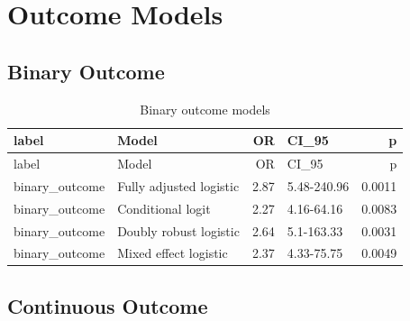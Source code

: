 \documentclass[
]{article}
\newenvironment{Shaded}{\begin{snugshade}}{\end{snugshade}}
\newcommand{\AttributeTok}[1]{\textcolor[rgb]{0.13,0.29,0.53}{#1}}
\newcommand{\DecValTok}[1]{\textcolor[rgb]{0.00,0.00,0.81}{#1}}
\newcommand{\FunctionTok}[1]{\textcolor[rgb]{0.13,0.29,0.53}{\textbf{#1}}}
\newcommand{\NormalTok}[1]{#1}
\newcommand{\OtherTok}[1]{\textcolor[rgb]{0.56,0.35,0.01}{#1}}
\newcommand{\SpecialCharTok}[1]{\textcolor[rgb]{0.81,0.36,0.00}{\textbf{#1}}}
\newcommand{\StringTok}[1]{\textcolor[rgb]{0.31,0.60,0.02}{#1}}
\begin{document}
\newpage

\section{Outcome Models}\label{outcome-models}

\subsection{Binary Outcome}\label{binary-outcome}

\begin{Shaded}
\end{Shaded}

\begin{longtable}[]{@{}llrlr@{}}
\caption{Binary outcome models}\tabularnewline
\toprule\noalign{}
label & Model & OR & CI\_95 & p \\
\midrule\noalign{}
\endfirsthead
\toprule\noalign{}
label & Model & OR & CI\_95 & p \\
\midrule\noalign{}
\endhead
\bottomrule\noalign{}
\endlastfoot
binary\_outcome & Fully adjusted logistic & 2.87 & 5.48-240.96 &
0.0011 \\
binary\_outcome & Conditional logit & 2.27 & 4.16-64.16 & 0.0083 \\
binary\_outcome & Doubly robust logistic & 2.64 & 5.1-163.33 & 0.0031 \\
binary\_outcome & Mixed effect logistic & 2.37 & 4.33-75.75 & 0.0049 \\
\end{longtable}

\subsection{Continuous Outcome}\label{continuous-outcome}
\end{document}
